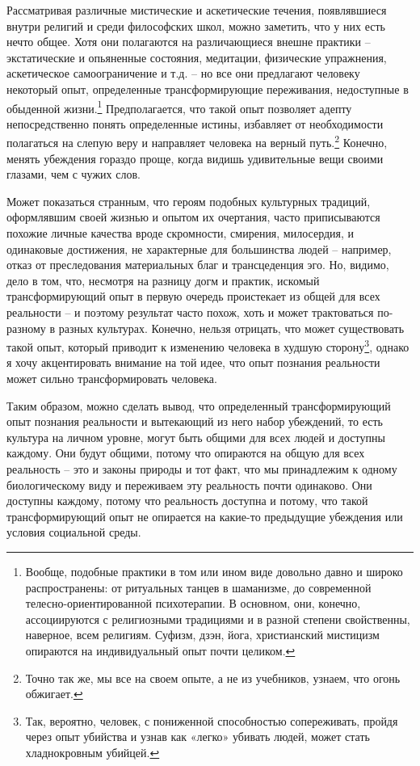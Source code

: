 \documentclass[12pt,a4paper]{report}
\begin{document}
Рассматривая различные мистические и аскетические течения, появлявшиеся внутри религий и среди философских школ, можно заметить, что у них есть нечто общее. Хотя они полагаются на различающиеся внешне практики -- экстатические и опьяненные состояния, медитации, физические упражнения, аскетическое самоограничение и т.д. -- но все они предлагают человеку некоторый опыт, определенные трансформирующие переживания, недоступные в обыденной жизни.\footnote{Вообще, подобные практики в том или ином виде довольно давно и широко распространены: от ритуальных танцев в шаманизме, до современной телесно-ориентированной психотерапии. В основном, они, конечно, ассоциируются с религиозными традициями и в разной степени свойственны, наверное, всем религиям. Суфизм, дзэн, йога, христианский мистицизм опираются на индивидуальный опыт почти целиком.} Предполагается, что такой опыт позволяет адепту непосредственно понять определенные истины, избавляет от необходимости полагаться на слепую веру и направляет человека на верный путь.\footnote{Точно так же, мы все на своем опыте, а не из учебников, узнаем, что огонь обжигает.} Конечно, менять убеждения гораздо проще, когда видишь удивительные вещи своими глазами, чем с чужих слов.

\noindent Может показаться странным, что героям подобных культурных традиций, оформлявшим своей жизнью и опытом их очертания, часто приписываются похожие личные качества вроде скромности, смирения, милосердия, и одинаковые достижения, не характерные для большинства людей -- например, отказ от преследования материальных благ и трансцеденция эго. Но, видимо, дело в том, что, несмотря на разницу догм и практик, искомый трансформирующий опыт в первую очередь проистекает из общей для всех реальности -- и поэтому результат часто похож, хоть и может трактоваться по-разному в разных культурах. Конечно, нельзя отрицать, что может существовать такой опыт, который приводит к изменению человека в худшую сторону\footnote{Так, вероятно, человек, с пониженной способностью сопереживать, пройдя через опыт убийства и узнав как «легко» убивать людей, может стать хладнокровным убийцей.}, однако я хочу акцентировать внимание на той идее, что опыт познания реальности может сильно трансформировать человека.

\noindent Таким образом, можно сделать вывод, что определенный трансформирующий опыт познания реальности и вытекающий из него набор убеждений, то есть культура на личном уровне, могут быть общими для всех людей и доступны каждому. Они будут общими, потому что опираются на общую для всех реальность -- это и законы природы и тот факт, что мы принадлежим к одному биологическому виду и переживаем эту реальность почти одинаково. Они доступны каждому, потому что реальность доступна и потому, что такой трансформирующий опыт не опирается на какие-то предыдущие убеждения или условия социальной среды.
\end{document}
